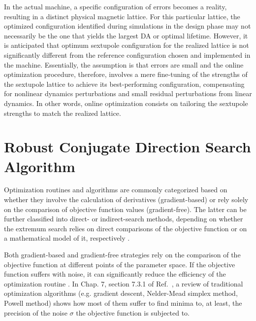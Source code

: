 In the actual machine, a specific configuration of errors becomes a reality, resulting in a distinct physical magnetic lattice. For this particular lattice, the optimized configuration identified during simulations in the design phase may not necessarily be the one that yields the largest \gls*{DA} or optimal lifetime. However, it is anticipated that optimum sextupole configuration for the realized lattice is not significantly different from the reference configuration chosen and implemented in the machine. Essentially, the assumption is that errors are small and the online optimization procedure, therefore, involves a mere fine-tuning of the strengths of the sextupole lattice to achieve its best-performing configuration, compensating for nonlinear dynamics perturbations and small residual perturbations from linear dynamics. In other words, online optimization consists on tailoring the sextupole strengths to match the realized lattice.

\section{Robust Conjugate Direction Search Algorithm}
Optimization routines and algorithms are commonly categorized based on whether they involve the calculation of derivatives (gradient-based) or rely solely on the comparison of objective function values (gradient-free). The latter can be further classified into direct- or indirect-search methods, depending on whether the extremum search relies on direct comparisons of the objective function or on a mathematical model of it, respectively \cite{press_numerical_2007}.

Both gradient-based and gradient-free strategies rely on the comparison of the objective function at different points of the parameter space. If the objective function suffers with noise, it can significantly reduce the efficiency of the optimization routine \cite{press_numerical_2007, huang_beam-based_2019}. In Chap. 7, section 7.3.1 of Ref.~\cite{huang_beam-based_2019}, a review of traditional optimization algorithms (e.g. gradient descent, Nelder-Mead simplex method, Powell method) shows how most of them suffer to find minima to, at least, the precision of the noise $\sigma$ the objective function is subjected to.

